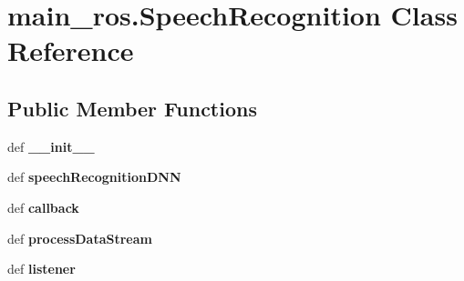 \hypertarget{classmain__ros_1_1SpeechRecognition}{\section{main\-\_\-ros.\-Speech\-Recognition Class Reference}
\label{classmain__ros_1_1SpeechRecognition}
}
\subsection*{Public Member Functions}
\begin{DoxyCompactItemize}
\item 
\hypertarget{classmain__ros_1_1SpeechRecognition_a63aaae87ab47b5e42bcc6051486f158c}{def {\bfseries \-\_\-\-\_\-init\-\_\-\-\_\-}}\label{classmain__ros_1_1SpeechRecognition_a63aaae87ab47b5e42bcc6051486f158c}

\item 
\hypertarget{classmain__ros_1_1SpeechRecognition_a9983cec7cf994263a15cb69a0d41c9c2}{def {\bfseries speech\-Recognition\-D\-N\-N}}\label{classmain__ros_1_1SpeechRecognition_a9983cec7cf994263a15cb69a0d41c9c2}

\item 
\hypertarget{classmain__ros_1_1SpeechRecognition_ac7e5524cd2cd1278c8b5aaba42900c57}{def {\bfseries callback}}\label{classmain__ros_1_1SpeechRecognition_ac7e5524cd2cd1278c8b5aaba42900c57}

\item 
\hypertarget{classmain__ros_1_1SpeechRecognition_a092b211b460b71240690021aec113597}{def {\bfseries process\-Data\-Stream}}\label{classmain__ros_1_1SpeechRecognition_a092b211b460b71240690021aec113597}

\item 
\hypertarget{classmain__ros_1_1SpeechRecognition_a52baec98ba4e562fb7a3c0dad36de7c5}{def {\bfseries listener}}\label{classmain__ros_1_1SpeechRecognition_a52baec98ba4e562fb7a3c0dad36de7c5}

\end{DoxyCompactItemize}

